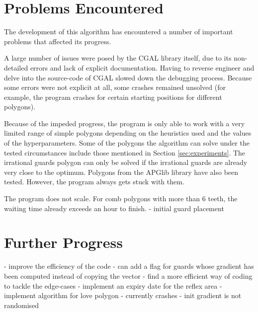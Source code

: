 \section{Problems Encountered}
The development of this algorithm has encountered a number of important problems that affected its progress.

A large number of issues were posed by the CGAL library itself, due to its non-detailed errors and lack of explicit documentation. Having to reverse engineer and delve into the source-code of CGAL slowed down the debugging process. Because some errors were not explicit at all, some crashes remained unsolved (for example, the program crashes for certain starting positions for different polygons).

Because of the impeded progress, the program is only able to work with a very limited range of simple polygons depending on the heuristics used and the values of the hyperparameters. Some of the polygons the algorithm can solve under the tested circumstances include those mentioned in Section \ref{sec:experiments}. The irrational guards polygon can only be solved if the irrational guards are already very close to the optimum. Polygons from the APGlib library \cite{art-gallery-instances-page} have also been tested. However, the program always gets stuck with them.

The program does not scale. For comb polygons with more than 6 teeth, the waiting time already exceeds an hour to finish.
- initial guard placement


\section{Further Progress}
- improve the efficiency of the code
    - can add a flag for guards whose gradient has been computed instead of copying the vector
- find a more efficient way of coding to tackle the edge-cases
- implement an expiry date for the reflex area
- implement algorithm for love polygon - currently crashes 
- init gradient is not randomised
